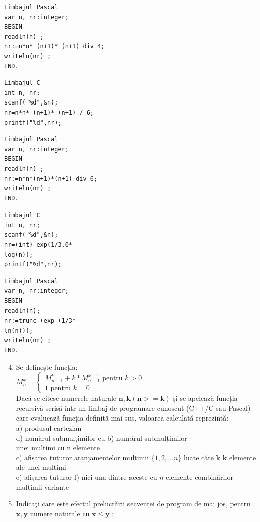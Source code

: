 \documentclass[10pt]{article}
\begin{document}
\begin{verbatim}
Limbajul Pascal
var n, nr:integer;
BEGIN
readln(n) ;
nr:=n*n* (n+1)* (n+1) div 4;
writeln(nr) ;
END.
\end{verbatim}

\begin{verbatim}
Limbajul C
int n, nr;
scanf("%d",&n);
nr=n*n* (n+1)* (n+1) / 6;
printf("%d",nr);
\end{verbatim}

\begin{verbatim}
Limbajul Pascal
var n, nr:integer;
BEGIN
readln(n) ;
nr:=n*n*(n+1)*(n+1) div 6;
writeln(nr) ;
END.
\end{verbatim}

\begin{verbatim}
Limbajul C
int n, nr;
scanf("%d",&n);
nr=(int) exp(1/3.0*
log(n));
printf("%d",nr);
\end{verbatim}

\begin{verbatim}
Limbajul Pascal
var n, nr:integer;
BEGIN
readln(n);
nr:=trunc (exp (1/3*
ln(n)));
writeln(nr) ;
END.
\end{verbatim}

\begin{enumerate}
  \setcounter{enumi}{3}
  \item Se definește funcția:\\
$M_{n}^{k}=\left\{\begin{array}{c}M_{n-1}^{k}+k * M_{n-1}^{k-1} \text { pentru } k>0 \\ 1 \text { pentru } k=0\end{array}\right.$\\
Dacă se citesc numerele naturale $\mathbf{n}, \mathbf{k}(\mathbf{n}>=\mathbf{k})$ și se apelează funcția recursivă scrisă într-un limbaj de programare cunoscut (C++/C sau Pascal) care evaluează funcția definită mai sus, valoarea calculată reprezintă:\\
a) produsul cartezian\\
d) numărul submulțimilor cu b) numărul submulțimilor\\
unei mulțimi cu n elemente\\
c) afișarea tuturor aranjamentelor mulțimii $\{1,2, . . . n\}$ luate câte $\mathbf{k}$ $\mathbf{k}$ elemente ale unei mulțimi\\
e) afiṣarea tuturor f) nici una dintre aceste cu $n$ elemente combinărilor mulțimii variante
  \item Indicaţi care este efectul prelucrării secvenței de program de mai jos, pentru $\mathbf{x}, \mathbf{y}$ numere naturale cu $\mathbf{x} \leq \mathbf{y}$ :
\end{enumerate}
\end{document}
